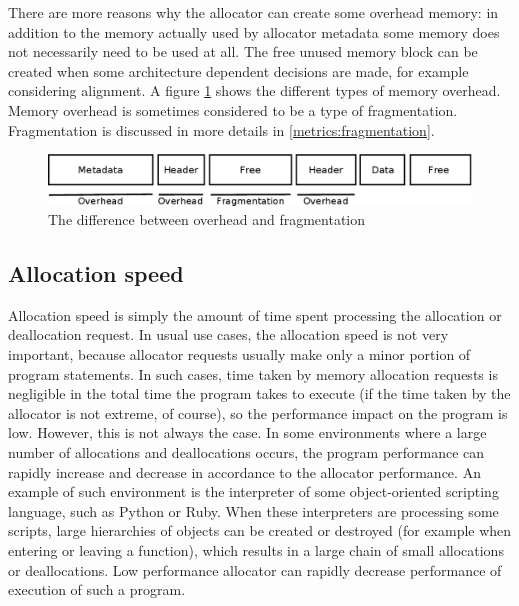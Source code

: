 There are more reasons why the allocator can create some overhead memory: in
addition to the memory actually used by allocator metadata some memory does not
necessarily need to be used at all. The free unused memory block can be created
when some architecture dependent decisions are made, for example considering
alignment. A figure \ref{fig:overhead} shows the different types of memory
overhead. Memory overhead is sometimes considered to be a type of fragmentation.
Fragmentation is discussed in more details in \ref{metrics:fragmentation}.

\begin{figure}[h]
\begin{center}
\includegraphics[width=1.0\textwidth,keepaspectratio]{fig/frags}
\end{center}
\caption{The difference between overhead and fragmentation}
\label{fig:overhead}
\end{figure}

\subsection{Allocation speed}

Allocation speed is simply the amount of time spent processing the allocation or
deallocation request. In usual use cases, the allocation speed is not very
important, because allocator requests usually make only a minor portion of
program statements. In such cases, time taken by memory allocation requests is
negligible in the total time the program takes to execute (if the time taken by
the allocator is not extreme, of course), so the performance impact on the
program is low. However, this is not always the case. In some environments where
a large number of allocations and deallocations occurs, the program performance
can rapidly increase and decrease in accordance to the allocator performance. An
example of such environment is the interpreter of some object-oriented scripting
language, such as Python or Ruby. When these interpreters are processing some
scripts, large hierarchies of objects can be created or destroyed (for example
when entering or leaving a function), which results in a large chain of small
allocations or deallocations. Low performance allocator can rapidly decrease
performance of execution of such a program.

